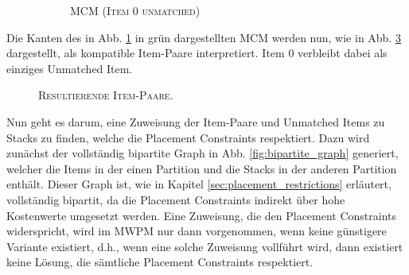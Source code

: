 \begin{figure}[H]
\begin{subfigure}[b]{0.4\textwidth}
    \caption{\textsc{MCM (Item $0$ unmatched)}}
    \label{fig:stacking_const_graph_example_b=2_b}
    \end{subfigure}
    \caption{}
    \label{fig:stacking_const_graph_example_b=2}
\end{figure}

Die Kanten des in Abb. \ref{fig:stacking_const_graph_example_b=2_b} in grün dargestellten \textsc{MCM} werden nun,
wie in Abb. \ref{fig:item_pairs_b=2} dargestellt, als kompatible Item-Paare interpretiert.
Item $0$ verbleibt dabei als einziges Unmatched Item.

\begin{figure}[H]
\centering
{}
  \caption{\textsc{Resultierende Item-Paare.}}
  \label{fig:item_pairs_b=2}
\end{figure}

Nun geht es darum, eine Zuweisung der Item-Paare und Unmatched Items zu Stacks zu finden, welche die Placement Constraints
respektiert. Dazu wird zunächst der vollständig bipartite Graph in Abb. \ref{fig:bipartite_graph} generiert, welcher
die Items in der einen Partition und die Stacks in der anderen Partition enthält.
Dieser Graph ist, wie in Kapitel \ref{sec:placement_restrictions} erläutert, vollständig bipartit, da die Placement Constraints indirekt
über hohe Kostenwerte umgesetzt werden. Eine Zuweisung, die den Placement Constraints widerspricht, wird im \textsc{MWPM}
nur dann vorgenommen, wenn keine günstigere Variante existiert, d.h., wenn eine solche Zuweisung vollführt wird,
dann existiert keine Lösung, die sämtliche Placement Constraints respektiert.

